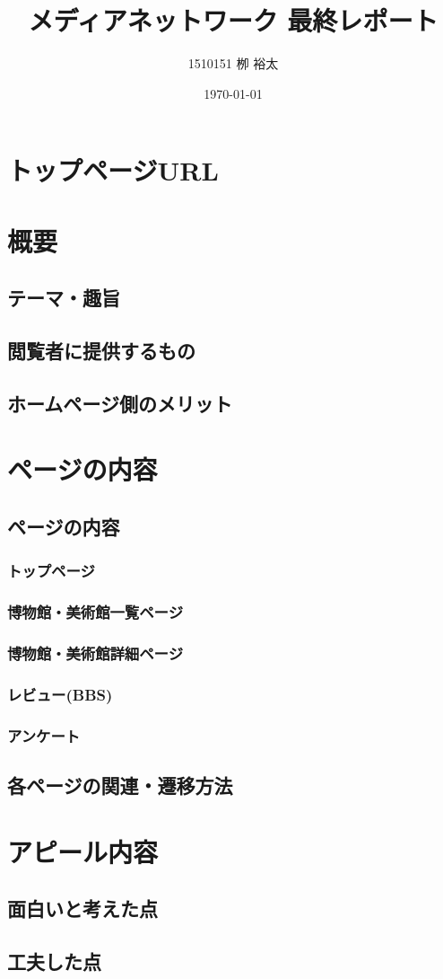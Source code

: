 \documentclass[11pt,a4paper, uplatex]{jsarticle}
\title{メディアネットワーク 最終レポート}
\author{1510151  栁 裕太}
\date{\today}
\begin{document}
\maketitle

\section{トップページURL}

\section{概要}
\subsection{テーマ・趣旨}
\subsection{閲覧者に提供するもの}
\subsection{ホームページ側のメリット}

\section{ページの内容}
\subsection{ページの内容}
\subsubsection{トップページ}
\subsubsection{博物館・美術館一覧ページ}
\subsubsection{博物館・美術館詳細ページ}
\subsubsection{レビュー(BBS)}
\subsubsection{アンケート}
\subsection{各ページの関連・遷移方法}

\section{アピール内容}
\subsection{面白いと考えた点}
\subsection{工夫した点}
\end{document}
